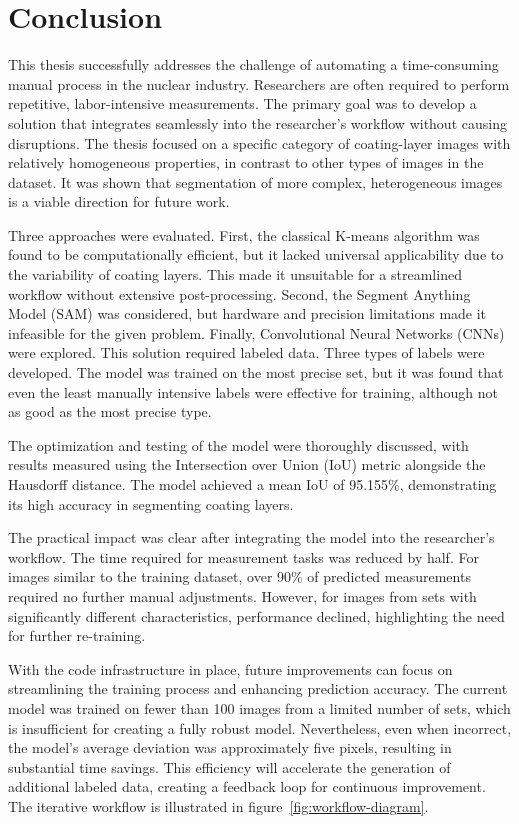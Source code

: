 \chapter{Conclusion} \label{chap:con}

This thesis successfully addresses the challenge of automating a time-consuming manual process in the nuclear industry. Researchers are often required to perform repetitive, labor-intensive measurements. The primary goal was to develop a solution that integrates seamlessly into the researcher’s workflow without causing disruptions. The thesis focused on a specific category of coating-layer images with relatively homogeneous properties, in contrast to other types of images in the dataset. It was shown that segmentation of more complex, heterogeneous images is a viable direction for future work.

Three approaches were evaluated. First, the classical K-means algorithm was found to be computationally efficient, but it lacked universal applicability due to the variability of coating layers. This made it unsuitable for a streamlined workflow without extensive post-processing. Second, the Segment Anything Model (SAM) was considered, but hardware and precision limitations made it infeasible for the given problem. Finally, Convolutional Neural Networks (CNNs) were explored. This solution required labeled data. Three types of labels were developed. The model was trained on the most precise set, but it was found that even the least manually intensive labels were effective for training, although not as good as the most precise type.

The optimization and testing of the model were thoroughly discussed, with results measured using the Intersection over Union (IoU) metric alongside the Hausdorff distance. The model achieved a mean IoU of  95.155\%, demonstrating its high accuracy in segmenting coating layers.

The practical impact was clear after integrating the model into the researcher’s workflow. The time required for measurement tasks was reduced by half. For images similar to the training dataset, over 90\% of predicted measurements required no further manual adjustments. However, for images from sets with significantly different characteristics, performance declined, highlighting the need for further re-training.

With the code infrastructure in place, future improvements can focus on streamlining the training process and enhancing prediction accuracy. The current model was trained on fewer than 100 images from a limited number of sets, which is insufficient for creating a fully robust model. Nevertheless, even when incorrect, the model's average deviation was approximately five pixels, resulting in substantial time savings. This efficiency will accelerate the generation of additional labeled data, creating a feedback loop for continuous improvement. The iterative workflow is illustrated in figure~\ref{fig:workflow-diagram}.

